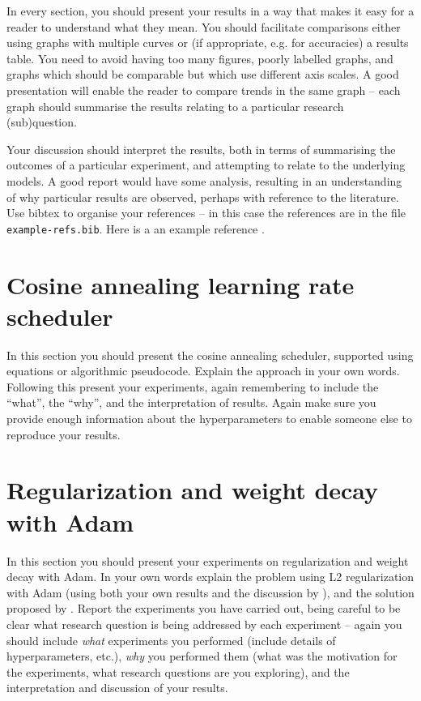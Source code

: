 \documentclass{article}
\begin{document}
In every section, you should present your results in a way that makes it easy for a reader to understand what they mean. You should facilitate comparisons either using graphs with multiple curves or (if appropriate, e.g. for accuracies) a results table. You need to avoid having too many figures, poorly labelled graphs, and graphs which should be comparable but which use different axis scales. A good presentation will enable the reader to compare trends in the same graph -- each graph should summarise the results relating to a particular research (sub)question.

Your discussion should interpret the results, both in terms of summarising the outcomes of a particular experiment, and attempting to relate to the underlying models. A good report would have some analysis, resulting in an understanding of why particular results are observed, perhaps with reference to the literature. Use bibtex to organise your references -- in this case the references are in the file \verb+example-refs.bib+.  Here is a an example reference \citep{langley00}.  

\section{Cosine annealing learning rate scheduler}
In this section you should present the cosine annealing scheduler,  supported using equations or algorithmic pseudocode.  Explain the approach in your own words.  Following this present your experiments, again remembering to include the ``what'', the ``why'', and the interpretation of results.  Again make sure you provide enough information about the hyperparameters to enable someone else to reproduce your results.

\section{Regularization and weight decay with Adam}
In this section you should present your experiments on regularization and weight decay with Adam.  In your own words explain the problem using L2 regularization with Adam (using both your own results and the discussion by \citet{loshchilov2018fixing}), and the solution proposed by \citeauthor{loshchilov2018fixing}.  Report the experiments you have carried out, being careful to be clear what research question is being addressed by each experiment -- again you should include \emph{what} experiments you performed (include details of hyperparameters, etc.),  \emph{why} you performed them (what was the motivation for the experiments, what research questions are you exploring), and the interpretation and discussion of your results.
\end{document}
